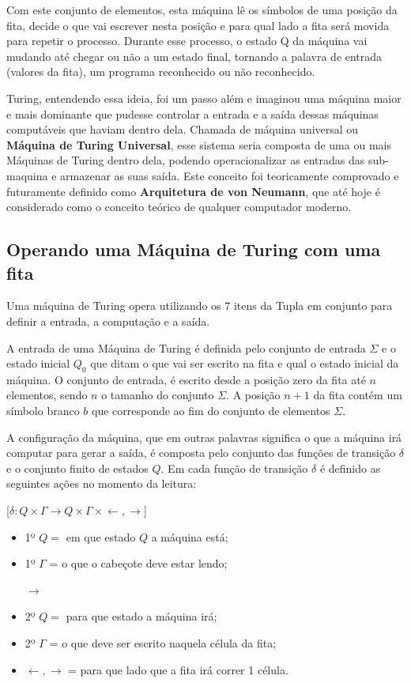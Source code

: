 \documentclass{article}
\begin{document}
    Com este conjunto de elementos, esta máquina lê os símbolos de uma posição da fita, decide o que vai escrever nesta posição e para qual lado a fita será movida para repetir o processo. Durante esse processo, o estado Q da máquina vai mudando até chegar ou não a um estado final, tornando a palavra de entrada (valores da fita), um programa reconhecido ou não reconhecido. 
    
    Turing, entendendo essa ideia, foi um passo além e imaginou uma máquina maior e mais dominante que pudesse controlar a entrada e a saída dessas máquinas computáveis que haviam dentro dela.  Chamada de máquina universal ou \textbf{Máquina de Turing Universal}, esse sistema seria composta de uma ou mais Máquinas de Turing dentro dela, podendo operacionalizar as entradas das sub-maquina e armazenar as suas saída. Este conceito foi teoricamente comprovado e futuramente definido como \textbf{Arquitetura de von Neumann}, que até hoje é considerado como o conceito teórico de qualquer computador moderno. 
    
    \subsection{Operando uma Máquina de Turing com uma fita}
    Uma máquina de Turing opera utilizando os 7 itens da Tupla em conjunto para definir a entrada, a computação e a saída.
    
    A entrada de uma Máquina de Turing é definida pelo conjunto de entrada $\Sigma$ e o estado inicial $Q_0$ que ditam o que vai ser escrito na fita e qual o estado inicial da máquina.  O conjunto de entrada, é escrito desde a posição zero da fita até $n$ elementos, sendo $n$ o tamanho do conjunto $\Sigma$. A posição $n+1$ da fita contém um símbolo branco $b$ que corresponde ao fim do conjunto de elementos $\Sigma$. 
    
	A configuração da máquina, que em outras palavras significa o que a máquina irá computar para gerar a saída, é composta pelo conjunto das funções de transição $\delta$ e o conjunto finito de estados $Q$. Em cada função de transição $\delta$ é definido as seguintes ações no momento da leitura:
	
    	[${\delta : Q\times \Gamma } \longrightarrow  Q\times \Gamma \times {\leftarrow ,\rightarrow}$]
    	
    \begin{itemize}
        \item 1º $Q = $ em que estado $Q$ a máquina está;
        \item 1º $\Gamma$ = o que o cabeçote deve estar lendo;
        
        $\longrightarrow$
        
        \item 2º $Q = $ para que estado a máquina irá;
		\item 2º $\Gamma$ = o que deve ser escrito naquela célula da fita;
		\item ${\leftarrow ,\rightarrow}$ = para que lado que a fita irá correr 1 célula.
			
	\end{itemize}
	
\end{document}
